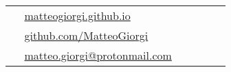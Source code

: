 \documentclass[10pt]{article} %
\begin{document}
\begin{paracol}{2}


\switchcolumn %


\parbox[top][0.12\textheight][c]{\linewidth}{ %
	\vspace{-0.04\textheight} %
	\colorbox{shade}{ %
		\begin{supertabular}{p{0.05\linewidth}|p{0.775\linewidth}} %
			\raisebox{-1pt}{\small\faHome} & \href{https://matteogiorgi.github.io}{matteogiorgi.github.io} \\ %
			\raisebox{-1pt}{\faGithub} & \href{https://github.com/MatteoGiorgi}{github.com/MatteoGiorgi} \\ %
			\raisebox{0pt}{\small\faPaperPlane} & \href{mailto:matteo.giorgi@protonmail.com}{matteo.giorgi@protonmail.com} \\ %
		\end{supertabular}
	}
}



\end{paracol}
\end{document}
